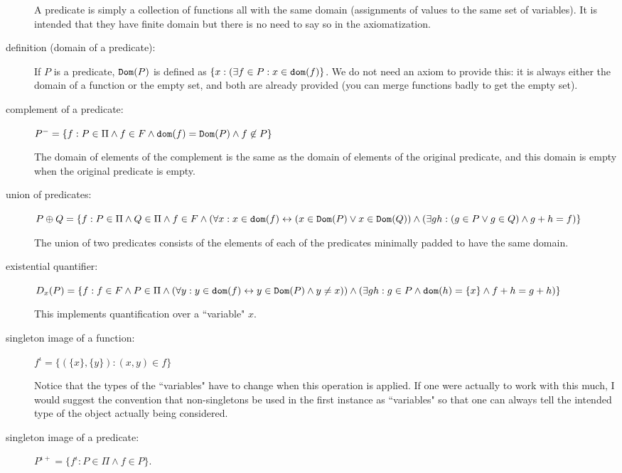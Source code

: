 \documentclass[12pt]{article}
\begin{document}
\begin{description}
A predicate is simply a collection of functions all with the same domain (assignments of values to the same set of variables).  It is intended that they have finite domain but there is no need to say so in the axiomatization.

\item[definition (domain of a predicate):]  If $P$ is a predicate, ${\tt Dom}(P)$ is defined
as $\{x:(\exists f\in P:x \in {\tt dom}(f)\}$.  We do not need an axiom to provide this:  it is always either the domain of a function or the empty set, and both are already provided (you can merge functions badly to get the empty set).

\item[complement of a predicate:]  $P^- = \{f:P \in \Pi \wedge f \in F \wedge {\tt dom}(f) = {\tt Dom}(P) \wedge f \not\in P\}$

The domain of elements of the complement is the same as the domain of elements of the original predicate, and this domain is empty when the original predicate is empty.

\item[union of predicates:]  $P \oplus Q = \{f:P \in \Pi \wedge Q \in \Pi \wedge f \in F \wedge (\forall x:x \in {\tt dom}(f) \leftrightarrow (x \in {\tt Dom}(P) \vee x \in {\tt Dom}(Q)) \wedge (\exists gh:(g\in P \vee g \in Q) \wedge g+h = f)\}$

The union of two predicates consists of the elements of each of the predicates minimally padded to have the same domain.

\item[existential quantifier:]  $D_x(P) = \{f:f \in F \wedge P \in \Pi \wedge  (\forall y:y \in {\tt dom}(f) \leftrightarrow y \in {\tt Dom}(P) \wedge y \neq x)) \wedge (\exists gh:g \in P \wedge {\tt dom}(h) = \{x\} \wedge f+h = g+h)\}$

This implements quantification over a ``variable" $x$.

\item[singleton image of a function:] $f^{\iota} = \{(\{x\},\{y\}):(x,y) \in f\}$

Notice that the types of the ``variables" have to change when this operation is applied.  If one were actually to work with this much, I would suggest
the convention that non-singletons be used in the first instance as ``variables" so that one can always tell the intended type of the object actually being considered.

\item[singleton image of a predicate:]  $P^{\iota+} = \{f^{\iota}:P \in \Pi \wedge f \in P\}$.


\end{description}
\end{document}
